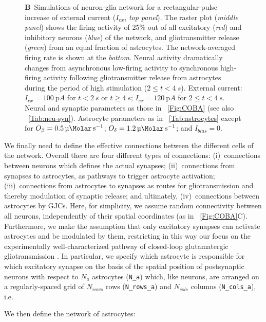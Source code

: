 \documentclass[a4paper, 11pt]{article}
\newcommand*{\tabref}[1]{\tablename~\ref{#1}}
\newcommand*{\figref}[1]{\figurename~\ref{#1}}
\begin{document}
\begin{figure}[!p]
{\textbf{B}~Simulations of neuron-glia network for a rectangular-pulse increase of external current ($I_{ex}$, \textit{top panel}).
The raster plot (\textit{middle panel}) shows the firing activity of 25\% out of all excitatory (\textit{red}) and inhibitory neurons (\textit{blue}) of the network, and gliotransmitter release (\textit{green}) from an equal fraction of astrocytes.
The network-averaged firing rate is shown at the \textit{bottom}.
Neural activity dramatically changes from asynchronous low-firing activity to synchronous high-firing activity following gliotransmitter release from astrocytes during the period of high stimulation ($2\le t < \SI{4}{s}$).
External current: $I_{ex}=\SI{100}{\pico A}$ for $t< \SI{2}{s}$ or $t\ge \SI{4}{s}$; $I_{ex}=\SI{120}{\pico A}$ for $2\le t < \SI{4}{s}$. Neural and synaptic parameters as those in \figref{Fig:COBA} (see also \tabref{Tab:neu-syn}). Astrocyte parameters as in \tabref{Tab:astrocytes} except for $O_\beta=\SI{0.5}{\micro \Molar.s^{-1}}$; $O_\delta=\SI{1.2}{\micro \Molar.s^{-1}}$; and $I_{bias}=0$.} 
\label{Fig:COBA_with_astro}
\end{figure}
We finally need to define the effective connections between the different cells of the network.
Overall there are four different types of connections:
(i)~connections between neurons which defines the actual synapses;
(ii)~connections from synapses to astrocytes, as pathways to trigger astrocyte activation;
(iii)~connections from astrocytes to synapses as routes for gliotransmission and thereby modulation of synaptic release;
and ultimately, (iv)~connections between astrocytes by GJCs.
Here, for simplicity, we assume random connectivity between all neurons, independently of their spatial coordinates (as in \figref{Fig:COBA}C).
Furthermore, we make the assumption that only excitatory synapses can activate astrocytes and be modulated by them, restricting in this way our focus on the experimentally well-characterized pathway of closed-loop glutamatergic gliotransmission \citep{PereaAraque_Science2007,Panatier_etal_Cell2011}.
In particular, we specify which astrocyte is responsible for which excitatory synapse on the basis of the spatial position of postsynaptic neurons with respect to $N_a$ astrocytes (\lstinline|N_a|) which, like neurons, are arranged on a regularly-spaced grid of $N_{rows}$ rows (\lstinline|N_rows_a|) and $N_{cols}$ columns (\lstinline|N_cols_a|), i.e.

We then define the network of astrocytes:

\end{document}
